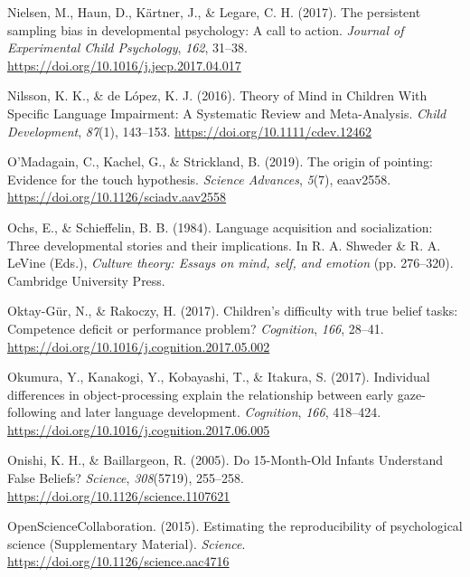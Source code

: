 \documentclass[
]{scrbook}
\newlength{\cslhangindent}
\newenvironment{CSLReferences}[2] %
 {\begin{list}{}{%
  \setlength{\itemindent}{0pt}
  \setlength{\leftmargin}{0pt}
  \setlength{\parsep}{0pt}
  \ifodd #1
   \setlength{\leftmargin}{\cslhangindent}
   \setlength{\itemindent}{-1\cslhangindent}
  \fi
  \setlength{\itemsep}{#2\baselineskip}}}
 {\end{list}}
\begin{document}
\begin{CSLReferences}{1}{0}
Nielsen, M., Haun, D., Kärtner, J., \& Legare, C. H. (2017). The persistent sampling bias in developmental psychology: {A} call to action. \emph{Journal of Experimental Child Psychology}, \emph{162}, 31--38. \url{https://doi.org/10.1016/j.jecp.2017.04.017}

Nilsson, K. K., \& de López, K. J. (2016). Theory of {Mind} in {Children With Specific Language Impairment}: {A Systematic Review} and {Meta-Analysis}. \emph{Child Development}, \emph{87}(1), 143--153. \url{https://doi.org/10.1111/cdev.12462}

O'Madagain, C., Kachel, G., \& Strickland, B. (2019). The origin of pointing: {Evidence} for the touch hypothesis. \emph{Science Advances}, \emph{5}(7), eaav2558. \url{https://doi.org/10.1126/sciadv.aav2558}

Ochs, E., \& Schieffelin, B. B. (1984). Language acquisition and socialization: {Three} developmental stories and their implications. In R. A. Shweder \& R. A. LeVine (Eds.), \emph{Culture theory: {Essays} on mind, self, and emotion} (pp. 276--320). Cambridge University Press.

Oktay-Gür, N., \& Rakoczy, H. (2017). Children's difficulty with true belief tasks: {Competence} deficit or performance problem? \emph{Cognition}, \emph{166}, 28--41. \url{https://doi.org/10.1016/j.cognition.2017.05.002}

Okumura, Y., Kanakogi, Y., Kobayashi, T., \& Itakura, S. (2017). Individual differences in object-processing explain the relationship between early gaze-following and later language development. \emph{Cognition}, \emph{166}, 418--424. \url{https://doi.org/10.1016/j.cognition.2017.06.005}

Onishi, K. H., \& Baillargeon, R. (2005). Do 15-{Month-Old Infants Understand False Beliefs}? \emph{Science}, \emph{308}(5719), 255--258. \url{https://doi.org/10.1126/science.1107621}

OpenScienceCollaboration. (2015). Estimating the reproducibility of psychological science ({Supplementary Material}). \emph{Science}. \url{https://doi.org/10.1126/science.aac4716}


\end{CSLReferences}
\end{document}
